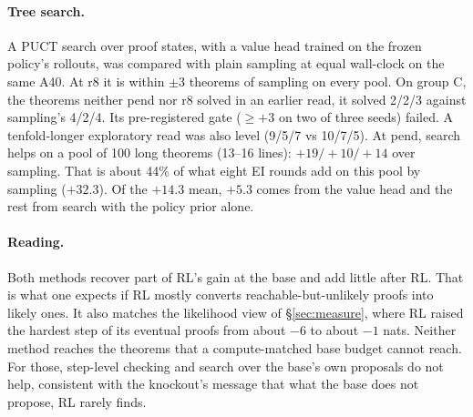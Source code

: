 \paragraph{Tree search.} A PUCT search over proof states, with a value head trained on the frozen policy's rollouts,
was compared with plain sampling at equal wall-clock on the same A40. At r8 it is within $\pm3$ theorems of sampling on
every pool. On group C, the theorems neither pend nor r8 solved in an earlier read, it solved 2/2/3 against sampling's
4/2/4. Its pre-registered gate ($\geq +3$ on two of three seeds) failed. A tenfold-longer exploratory read was also
level (9/5/7 vs 10/7/5). At pend, search helps on a pool of 100 long theorems (13--16 lines): $+19/+10/+14$ over
sampling. That is about 44\% of what eight EI rounds add on this pool by sampling ($+32.3$). Of the $+14.3$ mean,
$+5.3$ comes from the value head and the rest from search with the policy prior alone.

\paragraph{Reading.} Both methods recover part of RL's gain at the base and add little after RL. That is what one
expects if RL mostly converts reachable-but-unlikely proofs into likely ones. It also matches the likelihood view of
\S\ref{sec:measure}, where RL raised the hardest step of its eventual proofs from about $-6$ to about $-1$ nats.
Neither method reaches the theorems that a compute-matched base budget cannot reach. For those, step-level checking
and search over the base's own proposals do not help, consistent with the knockout's message that what the base does
not propose, RL rarely finds.
